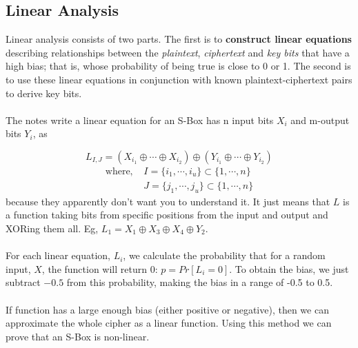     \subsection{Linear Analysis}
        Linear analysis consists of two parts. The first is to \textbf{construct linear equations} describing relationships between the \textit{plaintext}, \textit{ciphertext} and \textit{key bits} that have a high bias; that is, whose probability of being true is close to 0 or 1.  The second is to use these linear equations in conjunction with known plaintext-ciphertext pairs to derive key bits.\\
        \\
        The notes write a linear equation for an S-Box has n input bits $X_i$ and m-output bits $Y_i$, as

        \begin{equation}
            L_{I,J} = (X_{i_1} \oplus \cdots \oplus X_{i_2}) \oplus (Y_{i_1} \oplus \cdots \oplus Y_{i_2})
        \end{equation}
        \begin{align*}
            \text{where, } & I = \{i_1, \cdots ,i_u\} \subset \{1, \cdots ,n\}\\
            & J = \{j_1, \cdots ,j_u\} \subset \{1, \cdots ,n\}
        \end{align*}
        because they apparently don't want you to understand it. It just means that $L$ is a function taking bits from specific positions from the input and output and XORing them all. Eg, $L_1 = X_1 \oplus X_3 \oplus X_4 \oplus Y_2$.\\
        \\
        For each linear equation, $L_i$, we calculate the probability that for a random input, $X$, the function will return 0: $p=Pr[L_i=0]$. To obtain the bias, we just subtract $-0.5$ from this probability, making the bias in a range of -0.5 to 0.5.\\
        \\
        If function has a large enough bias (either positive or negative), then we can approximate the whole cipher as a linear function. Using this method we can prove that an S-Box is non-linear.

